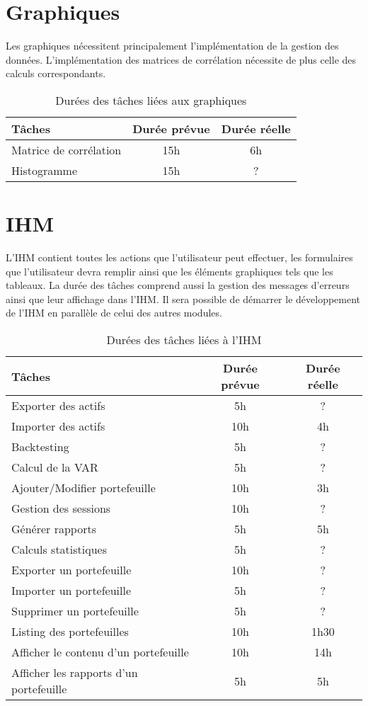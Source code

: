 \documentclass[a4paper]{report}
\begin{document}
\section{Graphiques}
Les graphiques nécessitent principalement l'implémentation de la gestion des données. L'implémentation des matrices de corrélation nécessite de plus celle des calculs correspondants.

\begin{table}[H]
\centering
  \begin{tabularx}{0.8\textwidth}{| X | c | c |}
    \hline
	Tâches & Durée prévue & Durée réelle \\
    \hline
    Matrice de corrélation &  15h & 6h\\
    Histogramme &  15h & ?\\
    \hline
  \end{tabularx}
  \caption{Durées des tâches liées aux graphiques}
\end{table}


\section{IHM}
L'IHM contient toutes les actions que l'utilisateur peut effectuer, les formulaires que l'utilisateur devra remplir ainsi que les éléments graphiques tels que les tableaux. La durée des tâches comprend aussi la gestion des messages d'erreurs ainsi que leur affichage dans l'IHM. Il sera possible de démarrer le développement de l'IHM en parallèle de celui des autres modules.

\begin{table}[H]
\centering
  \begin{tabularx}{0.8\textwidth}{| X | c | c |}
    \hline
	Tâches & Durée prévue & Durée réelle \\
    \hline
    Exporter des actifs & 5h & ?\\
    Importer des actifs & 10h & 4h\\
    Backtesting & 5h & ?\\
    Calcul de la VAR & 5h & ?\\
    Ajouter/Modifier portefeuille & 10h & 3h\\
    Gestion des sessions & 10h & ?\\
    Générer rapports & 5h & 5h\\
    Calculs statistiques & 5h & ?\\
    Exporter un portefeuille & 10h & ?\\
    Importer un portefeuille & 5h & ?\\
    Supprimer un portefeuille & 5h & ?\\
    Listing des portefeuilles & 10h & 1h30\\
    Afficher le contenu d'un portefeuille & 10h & 14h\\
    Afficher les rapports d'un portefeuille & 5h & 5h\\
    \hline
  \end{tabularx}
  \caption{Durées des tâches liées à l'IHM}
\end{table}
\end{document}
